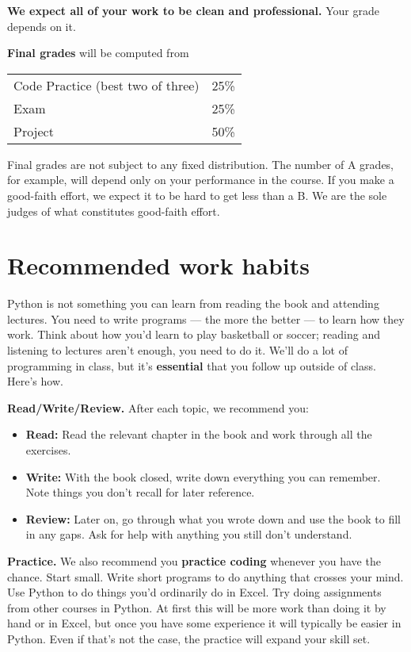 \documentclass[11pt]{article}
\begin{document}
{\bf We expect all of your work to be clean and professional.}  Your grade depends on it.


{\bf Final grades\/} will be computed from
\begin{center}
\begin{tabular}{ll}
Code Practice (best two of three) & 25\% \\
Exam        & 25\% \\
Project     & 50\% \\
\end{tabular}
\end{center}
Final grades are not subject to any fixed distribution.
The number of A grades, for example,
will depend only on your performance in the course.
If you make a good-faith effort,
we expect it to be hard to get less than a B.
We are the sole judges of what constitutes good-faith effort.


\section*{Recommended work habits}

Python is not something you can learn from reading the book and attending lectures.
You need to write programs ---
the more the better --- to learn how they work.
Think about how you'd learn to play basketball or soccer;
reading and listening to lectures aren't enough, you need to do it.
We'll do a lot of programming in class, but it's {\bf essential\/} that you
follow up outside of class.
Here's how.


{\bf Read/Write/Review.\/}
After each topic, we recommend you:
%
\begin{itemize}
\item {\bf Read:\/} Read the relevant chapter in the book and work through all the exercises.
\item {\bf Write:\/}  With the book closed, write down everything you can remember.  Note things
you don't recall for later reference.
\item {\bf Review:\/} Later on, go through what you wrote down and use the book to fill in any gaps.
Ask for help with anything you still don't understand.
\end{itemize}
%

{\bf Practice.\/}
We also recommend you {\bf practice coding\/} whenever you have the chance.
Start small. Write short programs to do anything that crosses your mind.
Use Python to do things you'd ordinarily do in Excel.
Try doing assignments from other courses in Python.
At first this will be more work than doing it by hand or in Excel,
but once you have some experience it will typically be easier in Python.
Even if that's not the case, the practice will expand your skill set.
\end{document}
